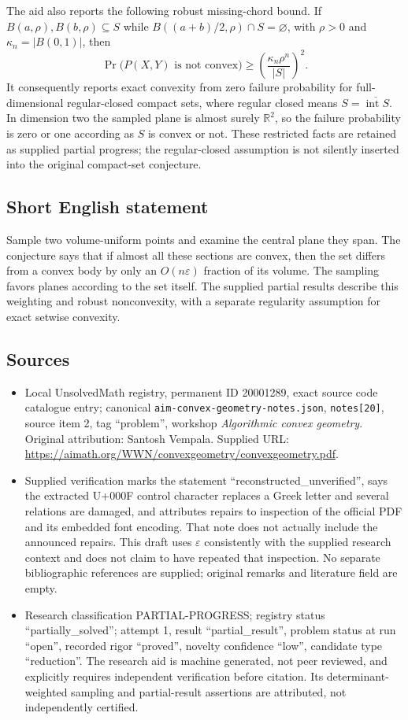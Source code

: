 \documentclass[11pt]{article}
\newcommand{\R}{\mathbb{R}}
\begin{document}
The aid also reports the following robust missing-chord bound. If $B(a,\rho),B(b,\rho)\subseteq S$ while $B((a+b)/2,\rho)\cap S=\varnothing$, with $\rho>0$ and $\kappa_n=|B(0,1)|$, then
\[
 \Pr\bigl(P(X,Y)\text{ is not convex}\bigr)
 \geq\left(\frac{\kappa_n\rho^n}{|S|}\right)^2.
\]
It consequently reports exact convexity from zero failure probability for full-dimensional regular-closed compact sets, where regular closed means $S=\overline{\operatorname{int}S}$. In dimension two the sampled plane is almost surely $\R^2$, so the failure probability is zero or one according as $S$ is convex or not. These restricted facts are retained as supplied partial progress; the regular-closed assumption is not silently inserted into the original compact-set conjecture.
\subsection{Short English statement}
Sample two volume-uniform points and examine the central plane they span. The conjecture says that if almost all these sections are convex, then the set differs from a convex body by only an $O(n\varepsilon)$ fraction of its volume. The sampling favors planes according to the set itself. The supplied partial results describe this weighting and robust nonconvexity, with a separate regularity assumption for exact setwise convexity.
\subsection{Sources}
\begin{itemize}
\item Local UnsolvedMath registry, permanent ID 20001289, exact source code catalogue entry; canonical \texttt{aim-convex-geometry-notes.json}, \texttt{notes[20]}, source item 2, tag ``problem'', workshop \emph{Algorithmic convex geometry}. Original attribution: Santosh Vempala. Supplied URL: \url{https://aimath.org/WWN/convexgeometry/convexgeometry.pdf}.
\item Supplied verification marks the statement ``reconstructed\_unverified'', says the extracted U+000F control character replaces a Greek letter and several relations are damaged, and attributes repairs to inspection of the official PDF and its embedded font encoding. That note does not actually include the announced repairs. This draft uses $\varepsilon$ consistently with the supplied research context and does not claim to have repeated that inspection. No separate bibliographic references are supplied; original remarks and literature field are empty.
\item Research classification PARTIAL-PROGRESS; registry status ``partially\_solved''; attempt 1, result ``partial\_result'', problem status at run ``open'', recorded rigor ``proved'', novelty confidence ``low'', candidate type ``reduction''. The research aid is machine generated, not peer reviewed, and explicitly requires independent verification before citation. Its determinant-weighted sampling and partial-result assertions are attributed, not independently certified.
\end{itemize}
\end{document}

